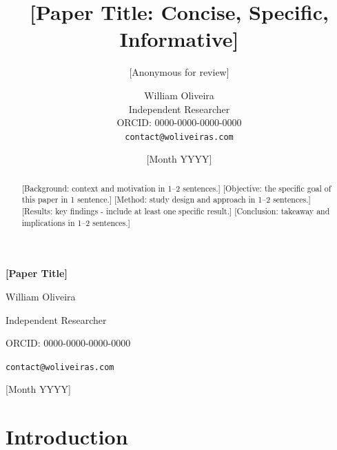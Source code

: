 \documentclass[11pt,a4paper]{article}
\title{[Paper Title: Concise, Specific, Informative]}
\author{[Anonymous for review]}
\date{}
\author{William Oliveira\\
  Independent Researcher\\
  ORCID: 0000-0000-0000-0000\\
  \texttt{contact@woliveiras.com}}
\date{[Month YYYY]}
\newif\ifanonymized
\begin{document}
\begin{titlepage}
  \centering
  \vspace*{\fill}
  {\LARGE\bfseries [Paper Title]\par}
  \vspace{2em}
  \ifanonymized
    {\large [Anonymous for review]\par}
  \else
    {\large William Oliveira\par}
    \vspace{0.5em}
    {\normalsize Independent Researcher\par}
    {\normalsize ORCID: 0000-0000-0000-0000\par}
    {\normalsize \texttt{contact@woliveiras.com}\par}
    \vspace{1em}
    {\normalsize [Month YYYY]\par}
  \fi
  \vspace*{\fill}
\end{titlepage}

\begin{titlepage}
  \vspace*{\fill}
  \begin{abstract}
[Background: context and motivation in 1–2 sentences.]
[Objective: the specific goal of this paper in 1 sentence.]
[Method: study design and approach in 1–2 sentences.]
[Results: key findings - include at least one specific result.]
[Conclusion: takeaway and implications in 1–2 sentences.]
  \end{abstract}
  \vspace*{\fill}
\end{titlepage}

\tableofcontents
\thispagestyle{empty}
\newpage

\section{Introduction}
\label{sec:introduction}
\end{document}
